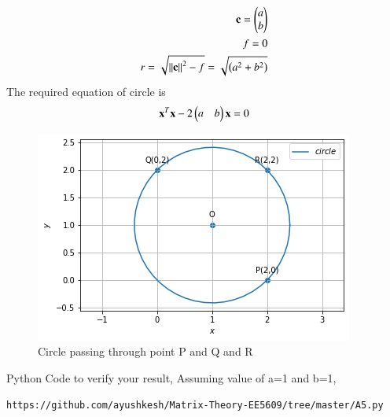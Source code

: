 \documentclass[journal,12pt,twocolumn]{IEEEtran}
\begin{document}
\begin{align}
    \mathbf{c} = \begin{pmatrix}a\\b\end{pmatrix}\\
    f = 0\\
    r=\sqrt{\left\lVert\mathbf{c}\right\rVert^2-f} = \sqrt{\left(a^2+b^2\right)}
\end{align}
The required equation of circle is 
\begin{align}
\mathbf{x}^T\mathbf{x}-2\begin{pmatrix}a&b\end{pmatrix}\mathbf{x} = 0
\end{align}
\begin{figure}[!ht]
\centering
\includegraphics[width=\columnwidth]{5.png}
\caption{Circle passing through point P and Q and R}
\label{Fig:5}
\end{figure}
Python Code to verify your result, Assuming value of a=1 and b=1, 
\begin{lstlisting}
https://github.com/ayushkesh/Matrix-Theory-EE5609/tree/master/A5.py
\end{lstlisting}
\end{document}

